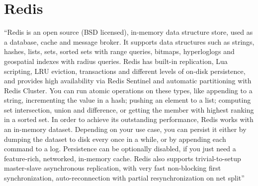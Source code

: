 \section{Redis}

“Redis is an open source (BSD licensed), in-memory data structure store, used
as a database, cache and message broker. It supports data structures such as
strings, hashes, lists, sets, sorted sets with range queries, bitmaps, 
hyperloglogs and geospatial indexes with radius queries. Redis has built-in 
replication, Lua scripting, LRU eviction, transactions and different levels 
of on-disk persistence, and provides high availability via Redis Sentinel and
automatic partitioning with Redis Cluster.
You can run atomic operations on these types, like appending to a string, 
incrementing the value in a hash; pushing an element to a list; computing set
intersection, union and difference, or getting the member with highest 
ranking in a sorted set.
In order to achieve its outstanding performance, Redis works with an in-memory
dataset. Depending on your use case, you can persist it either by dumping the
dataset to disk every once in a while, or by appending each command to a log.
Persistence can be optionally disabled, if you just need a feature-rich, 
networked, in-memory cache.
Redis also supports trivial-to-setup master-slave asynchronous replication, 
with very fast non-blocking first synchronization, auto-reconnection with 
partial resynchronization on net split”~\cite{hid-sp18-520-Redis}
